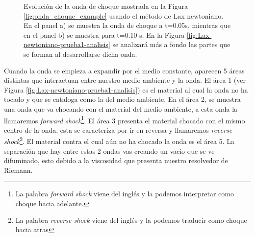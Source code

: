 \documentclass[12pt,a4paper]{book}
\begin{document}
\begin{figure}
\caption{\label{fig:Lax-newtoniano_sedov-3-5}Evolución de la onda de choque mostrada en la Figura \ref{fig:onda_choque_example} usando el método de Lax newtoniano. En el panel a) se muestra la onda de choque a t=0.05s, mientras que en el panel b) se muestra para t=0.10 s. En la Figura \ref{fig:Lax-newtoniano-prueba1-analisis} se analizará más a fondo las partes que se forman al desarrollarse dicha onda.}
\end{figure}


Cuando la onda se empieza a expandir por el medio constante, aparecen 5 áreas distintas que interactuan entre nuestro medio ambiente y la onda. El área 1 (ver Figura \ref{fig:Lax-newtoniano-prueba1-analisis}) es el material al cual la onda no ha tocado y que se cataloga como la del medio ambiente. En el área 2, se muestra una onda que va chocando con el material del medio ambiente, a esta onda la llamaremos \emph{forward shock}\footnote{La palabra \emph{forward shock} viene del inglés y la podemos interpretar como choque hacia adelante. }. El área 3 presenta el material chocado con el mismo centro de la onda, esta se caracteriza por ir en reversa y llamaremos \emph{reverse shock}\footnote{La palabra \emph{reverse shock} viene del inglés y la podemos traducir como choque hacia atras}. El material contra el cual aún no ha chocado la onda es el área 5. La separación que hay entre estas 2 ondas vas creando un vacio que se ve difuminado, esto debido a la viscosidad que presenta nuestro resolvedor de Riemann.
\end{document}
